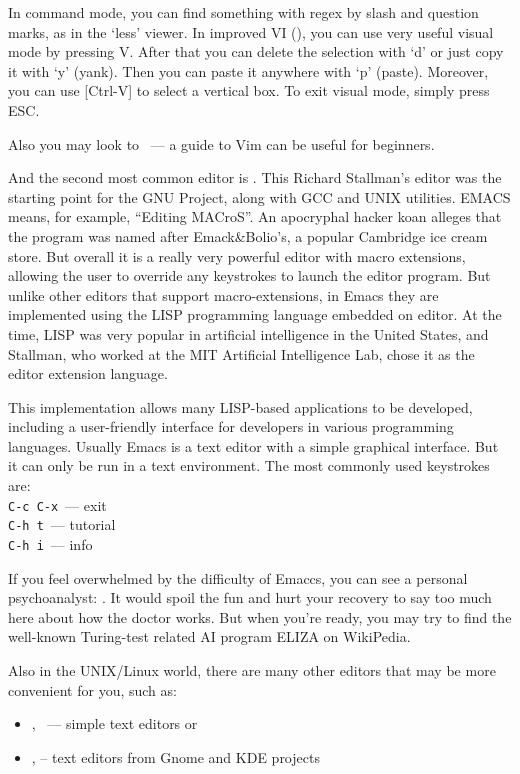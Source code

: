 In command mode, you can find something with regex by slash and question marks,
as in the `less' viewer. In improved VI (), you can use very useful
visual mode by pressing V. After that you can delete the selection with `d' or
just copy it with `y' (yank). Then you can paste it anywhere with `p' (paste).
Moreover, you can use [Ctrl-V] to select a vertical box.
To exit visual mode, simply press ESC.

Also you may look to ~--- a guide to Vim can be useful
for beginners.

And the second most common editor is . This Richard Stallman's editor
was the starting point for the GNU Project, along with GCC and UNIX utilities.
EMACS means, for example, ``Editing MACroS''. An apocryphal hacker koan alleges
that the program was named after Emack\&Bolio's, a popular Cambridge ice cream
store. But overall it is a really very powerful editor with macro extensions,
allowing the user to override any keystrokes to launch the editor program.
But unlike other editors that support macro-extensions, in Emacs they are
implemented using the LISP programming language embedded on editor.
At the time, LISP was very popular in artificial intelligence in
the United States, and Stallman, who worked at the MIT Artificial Intelligence
Lab, chose it as the editor extension language.

This implementation allows many LISP-based applications to be developed,
including a user-friendly interface for developers in various programming
languages. Usually Emacs is a text editor with a simple graphical interface.
But it can only be run in a text environment. The most commonly used
keystrokes are:\\
\verb|C-c C-x|~--- exit\\
\verb|C-h t|~--- tutorial\\
\verb|C-h i|~--- info

\medskip
If you feel overwhelmed by the difficulty of Emaccs, you can see a personal
psychoanalyst: . It would spoil the fun and hurt your recovery
to say too much here about how the doctor works. But when you're ready,
you may try to find the well-known Turing-test related AI program ELIZA
on WikiPedia.

Also in the UNIX/Linux world, there are many other editors that may be more
convenient for you, such as:
\begin{itemize}
\item {}, ~--- simple text editors or
\item {},  -- text editors from Gnome and KDE projects
\end{itemize}
